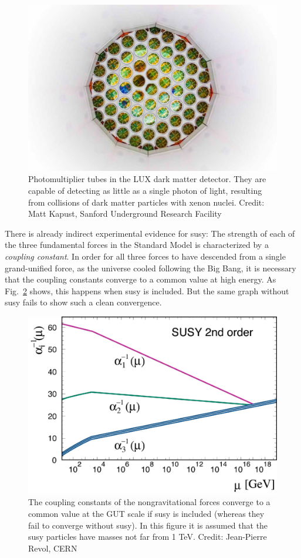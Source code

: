 \documentclass[12pt]{iopart}
\begin{document}
\begin{figure}[htbp]
\centering
\includegraphics[bb=0 0 360 260, width=5in]{Fig13x-LUX.eps}
\caption{Photomultiplier tubes in the LUX dark matter detector. They are capable of detecting as little as a single photon of light, resulting from collisions of dark matter particles with xenon nuclei. Credit: Matt Kapust, Sanford Underground Research Facility \label{Fig13x-LUX.eps}}
\end{figure}

There is already indirect experimental evidence for susy: The strength of each of the three fundamental forces in the Standard Model is characterized by a \textit{coupling constant}. In order for all three forces to have descended from a single grand-unified force, as the universe cooled following the Big Bang, it is necessary that the coupling constants converge to a common value at high energy. As Fig.~\ref{Fig13b-susy-GUT.eps} shows, this happens when susy is included. But the same graph without susy fails to show such a clean convergence.
\begin{figure}[htbp]
\centering
\includegraphics[bb=0 0 360 270, width=5in]{Fig13b-susy-GUT.eps}
\caption{The coupling constants of the nongravitational forces converge to a common value at the GUT scale if susy is included (whereas they fail to converge without susy). In this figure it is assumed that the susy particles have masses not far from 1 TeV. Credit: Jean-Pierre Revol, CERN \label{Fig13b-susy-GUT.eps}}
\end{figure}
\end{document}
